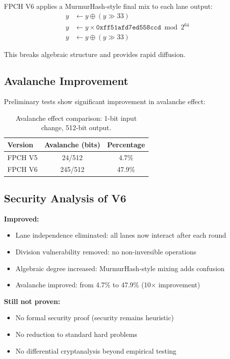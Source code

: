\documentclass[11pt,a4paper]{article}
\theoremstyle{plain}
\theoremstyle{definition}
\theoremstyle{remark}
\begin{document}
FPCH V6 applies a MurmurHash-style final mix to each lane output:
\begin{align}
y &\leftarrow y \oplus (y \gg 33) \\
y &\leftarrow y \times \texttt{0xff51afd7ed558ccd} \bmod 2^{64} \\
y &\leftarrow y \oplus (y \gg 33)
\end{align}

This breaks algebraic structure and provides rapid diffusion.

\subsection{Avalanche Improvement}

Preliminary tests show significant improvement in avalanche effect:

\begin{table}[h]
\centering
\begin{tabular}{lcc}
\toprule
Version & Avalanche (bits) & Percentage \\
\midrule
FPCH V5 & 24/512 & 4.7\% \\
FPCH V6 & 245/512 & 47.9\% \\
\bottomrule
\end{tabular}
\caption{Avalanche effect comparison: 1-bit input change, 512-bit output.}
\label{tab:avalanche}
\end{table}

\subsection{Security Analysis of V6}

\textbf{Improved:}
\begin{itemize}
    \item Lane independence eliminated: all lanes now interact after each round
    \item Division vulnerability removed: no non-inversible operations
    \item Algebraic degree increased: MurmurHash-style mixing adds confusion
    \item Avalanche improved: from 4.7\% to 47.9\% (10$\times$ improvement)
\end{itemize}

\textbf{Still not proven:}
\begin{itemize}
    \item No formal security proof (security remains heuristic)
    \item No reduction to standard hard problems
    \item No differential cryptanalysis beyond empirical testing
\end{itemize}
\end{document}
